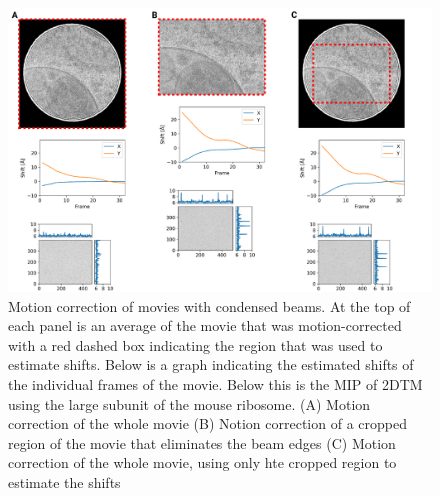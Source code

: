 \documentclass[
]{article}
\newenvironment{fignos:tagged-figure}[1][]{
    \let\oldthefigure\thefigure
    \let\oldtheHfigure\theHfigure
    \renewcommand{\thefigure}{#1}
    \renewcommand{\theHfigure}{#1}
  }{
    \let\thefigure\oldthefigure
    \let\theHfigure\oldtheHfigure
    \addtocounter{figure}{-1}
  }
\begin{document}
\begin{fignos:tagged-figure}[S4]

\begin{figure}
\hypertarget{fig:crop_unblur}{%
\centering
\includegraphics{figures/crop_unblur.png}
\caption{Motion correction of movies with condensed beams.
At the top of each panel is an average of the movie that was motion-corrected
with a red dashed box indicating the region that was used to estimate shifts.
Below is a graph indicating the estimated shifts of the individual frames of the
movie. Below this is the MIP of 2DTM using the large subunit of the mouse ribosome.
(A) Motion correction of the whole movie
(B) Notion correction of a cropped region of the movie that eliminates the beam
edges
(C) Motion correction of the whole movie, using only hte cropped region to
estimate the shifts}\label{fig:crop_unblur}
}
\end{figure}

\end{fignos:tagged-figure}
\end{document}
